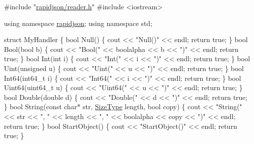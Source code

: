 \begin{DoxyCode}
\textcolor{preprocessor}{#include "\hyperlink{reader_8h}{rapidjson/reader.h}"}
\textcolor{preprocessor}{#include <iostream>}

\textcolor{keyword}{using namespace }\hyperlink{namespacerapidjson}{rapidjson};
\textcolor{keyword}{using namespace }std;

\textcolor{keyword}{struct }MyHandler \{
    \textcolor{keywordtype}{bool} Null() \{ cout << \textcolor{stringliteral}{"Null()"} << endl; \textcolor{keywordflow}{return} \textcolor{keyword}{true}; \}
    \textcolor{keywordtype}{bool} Bool(\textcolor{keywordtype}{bool} b) \{ cout << \textcolor{stringliteral}{"Bool("} << boolalpha << b << \textcolor{stringliteral}{")"} << endl; \textcolor{keywordflow}{return} \textcolor{keyword}{true}; \}
    \textcolor{keywordtype}{bool} Int(\textcolor{keywordtype}{int} i) \{ cout << \textcolor{stringliteral}{"Int("} << i << \textcolor{stringliteral}{")"} << endl; \textcolor{keywordflow}{return} \textcolor{keyword}{true}; \}
    \textcolor{keywordtype}{bool} Uint(\textcolor{keywordtype}{unsigned} u) \{ cout << \textcolor{stringliteral}{"Uint("} << u << \textcolor{stringliteral}{")"} << endl; \textcolor{keywordflow}{return} \textcolor{keyword}{true}; \}
    \textcolor{keywordtype}{bool} Int64(int64\_t i) \{ cout << \textcolor{stringliteral}{"Int64("} << i << \textcolor{stringliteral}{")"} << endl; \textcolor{keywordflow}{return} \textcolor{keyword}{true}; \}
    \textcolor{keywordtype}{bool} Uint64(uint64\_t u) \{ cout << \textcolor{stringliteral}{"Uint64("} << u << \textcolor{stringliteral}{")"} << endl; \textcolor{keywordflow}{return} \textcolor{keyword}{true}; \}
    \textcolor{keywordtype}{bool} Double(\textcolor{keywordtype}{double} d) \{ cout << \textcolor{stringliteral}{"Double("} << d << \textcolor{stringliteral}{")"} << endl; \textcolor{keywordflow}{return} \textcolor{keyword}{true}; \}
    \textcolor{keywordtype}{bool} String(\textcolor{keyword}{const} \textcolor{keywordtype}{char}* str, \hyperlink{rapidjson_8h_a5ed6e6e67250fadbd041127e6386dcb5}{SizeType} length, \textcolor{keywordtype}{bool} copy) \{ 
        cout << \textcolor{stringliteral}{"String("} << str << \textcolor{stringliteral}{", "} << length << \textcolor{stringliteral}{", "} << boolalpha << copy << \textcolor{stringliteral}{")"} << endl;
        \textcolor{keywordflow}{return} \textcolor{keyword}{true};
    \}
    \textcolor{keywordtype}{bool} StartObject() \{ cout << \textcolor{stringliteral}{"StartObject()"} << endl; \textcolor{keywordflow}{return} \textcolor{keyword}{true}; \}

\end{DoxyCode}
